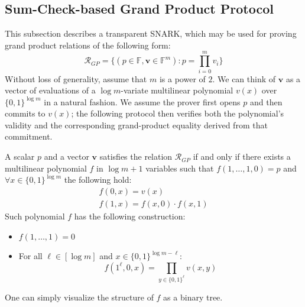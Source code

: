 \documentclass[../lecture-notes-148x210.tex]{subfiles}
\begin{document}
\subsection{Sum-Check-based Grand Product Protocol}
\label{sec:grand-products}

This subsection describes a transparent SNARK, which may be used for proving grand product relations of the following form:
\begin{equation}
\mathcal{R}_{GP} = \big\{ (p \in \mathbb{F}, \mathbf{v} \in \mathbb{F}^m)\colon p = \prod_{i=0}^m v_i \big\} \label{grand-product-relation}
\end{equation}
Without loss of generality, assume that $m$ is a power of $2$.
We can think of $\mathbf{v}$ as a vector of evaluations of a $\log m$-variate multilinear polynomial $v(x)$ over 
$\{0, 1\}^{\log m}$ in a natural fashion. We assume the prover first opens $p$ and then commits to $v(x)$; the 
following protocol then verifies both the polynomial’s validity and the corresponding grand-product equality derived
from that commitment.

\begin{lemma}
A scalar $p$ and a vector $\mathbf{v}$ satisfies the relation $\mathcal{R}_{GP}$ if and only if there exists a 
multilinear polynomial $f$ in $\log m + 1$ variables such that $f(1,\dots,1, 0) = p$ and $\forall x \in \{0,1\}^{\log m}$
 the following hold:
\begin{gather*}
f(0, x) = v(x)\\
f(1,x) = f(x, 0) \cdot f(x, 1)
\end{gather*}
Such polynomial $f$ has the following construction: \begin{itemize}
    \item $f(1,\dots,1) = 0$
    \item For all $\ell \in [\log m]$ and $x \in \{0,1\}^{\log m - \ell}$: \\ 
    \vspace{-0.8em}
    \begin{equation*}
        f(1^\ell, 0, x) = \prod_{y \in \{0,1\}^\ell}v(x,y)
    \end{equation*}
\end{itemize}
\end{lemma}

One can simply visualize the structure of $f$ as a binary tree.
\end{document}
